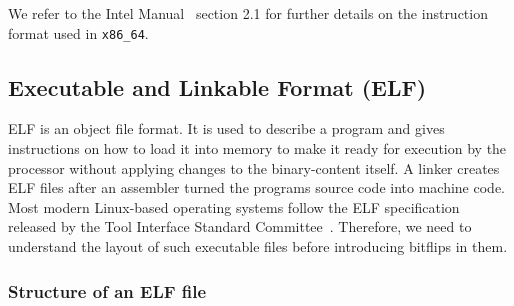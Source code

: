 We refer to the Intel Manual~\cite{intelsys} section 2.1 for further details on
the instruction format used in \texttt{x86\_64}.

\subsection{Executable and Linkable Format (ELF)}

ELF is an object file format. It is used to describe a program and gives
instructions on how to load it into memory to make it ready for execution
by the processor without applying changes to the binary-content itself. A
linker creates ELF files after an assembler turned the program\textquotesingle s
source code into machine code. Most modern Linux-based operating systems follow
the ELF specification released by the Tool Interface Standard
Committee~\cite{elfspec}. Therefore, we need to understand the layout of such
executable files before introducing bitflips in them.

\subsubsection{Structure of an ELF file}

